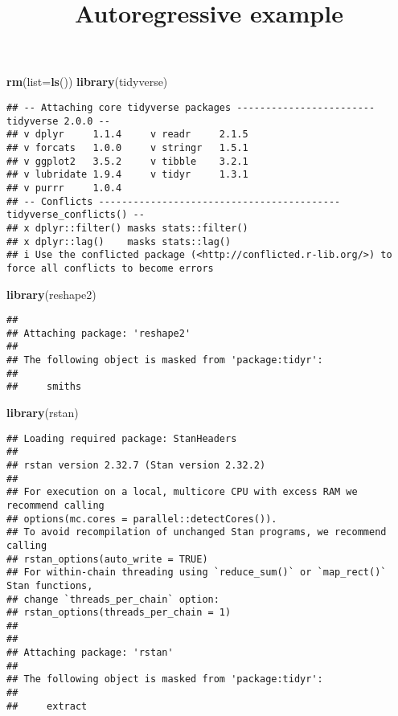 \documentclass[
]{article}
\title{Autoregressive example}
\author{}
\date{\vspace{-2.5em}}
\newenvironment{Shaded}{\begin{snugshade}}{\end{snugshade}}
\newcommand{\AttributeTok}[1]{\textcolor[rgb]{0.13,0.29,0.53}{#1}}
\newcommand{\FunctionTok}[1]{\textcolor[rgb]{0.13,0.29,0.53}{\textbf{#1}}}
\newcommand{\NormalTok}[1]{#1}
\begin{document}
\maketitle

\begin{Shaded}
\begin{Highlighting}[]
\FunctionTok{rm}\NormalTok{(}\AttributeTok{list=}\FunctionTok{ls}\NormalTok{())}
\FunctionTok{library}\NormalTok{(tidyverse)}
\end{Highlighting}
\end{Shaded}

\begin{verbatim}
## -- Attaching core tidyverse packages ------------------------ tidyverse 2.0.0 --
## v dplyr     1.1.4     v readr     2.1.5
## v forcats   1.0.0     v stringr   1.5.1
## v ggplot2   3.5.2     v tibble    3.2.1
## v lubridate 1.9.4     v tidyr     1.3.1
## v purrr     1.0.4     
## -- Conflicts ------------------------------------------ tidyverse_conflicts() --
## x dplyr::filter() masks stats::filter()
## x dplyr::lag()    masks stats::lag()
## i Use the conflicted package (<http://conflicted.r-lib.org/>) to force all conflicts to become errors
\end{verbatim}

\begin{Shaded}
\begin{Highlighting}[]
\FunctionTok{library}\NormalTok{(reshape2)}
\end{Highlighting}
\end{Shaded}

\begin{verbatim}
## 
## Attaching package: 'reshape2'
## 
## The following object is masked from 'package:tidyr':
## 
##     smiths
\end{verbatim}

\begin{Shaded}
\begin{Highlighting}[]
\FunctionTok{library}\NormalTok{(rstan)}
\end{Highlighting}
\end{Shaded}

\begin{verbatim}
## Loading required package: StanHeaders
## 
## rstan version 2.32.7 (Stan version 2.32.2)
## 
## For execution on a local, multicore CPU with excess RAM we recommend calling
## options(mc.cores = parallel::detectCores()).
## To avoid recompilation of unchanged Stan programs, we recommend calling
## rstan_options(auto_write = TRUE)
## For within-chain threading using `reduce_sum()` or `map_rect()` Stan functions,
## change `threads_per_chain` option:
## rstan_options(threads_per_chain = 1)
## 
## 
## Attaching package: 'rstan'
## 
## The following object is masked from 'package:tidyr':
## 
##     extract
\end{verbatim}
\end{document}
